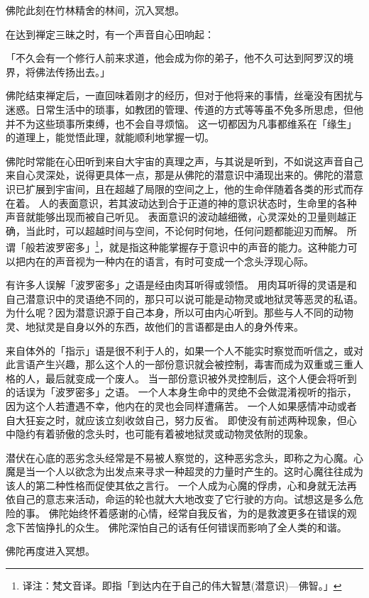 \documentclass[twoside,openany]{book}
\begin{document}
佛陀此刻在竹林精舍的林间，沉入冥想。

在达到禅定三昧之时，有一个声音自心田响起：

「不久会有一个修行人前来求道，他会成为你的弟子，他不久可达到阿罗汉的境界，将佛法传扬出去。」

佛陀结束禅定后，一直回味着刚才的经历，但对于他将来的事情，丝毫没有困扰与迷惑。日常生活中的琐事，如教团的管理、传道的方式等等虽不免多所思虑，但他并不为这些琐事所束缚，也不会自寻烦恼。
这一切都因为凡事都维系在「缘生」的道理上，能觉悟此理，就能顺利地掌握一切。

佛陀时常能在心田听到来自大宇宙的真理之声，与其说是听到，不如说这声音自己来自心灵深处，说得更具体一点，那是从佛陀的潜意识中涌现出来的。佛陀的潜意识已扩展到宇宙间，且在超越了局限的空间之上，他的生命伴随着各类的形式而存在着。
人的表面意识，若其波动达到合于正道的神的意识状态时，生命里的各种声音就能够出现而被自己听见。
表面意识的波动越细微，心灵深处的卫量则越正确，当此时，可以超越时间与空间，不论何时何地，任何问题都能迎刃而解。
所谓「般若波罗密多」\footnote{译注：梵文音译。即指「到达内在于自己的伟大智慧(潜意识)—佛智。」}，就是指这种能掌握存于意识中的声音的能力。这种能力可以把内在的声音视为一种内在的语言，有时可变成一个念头浮现心际。

有许多人误解「波罗密多」之语是经由肉耳听得或领悟。
用肉耳听得的灵语是和自己潜意识中的灵语绝不同的，那只可以说可能是动物灵或地狱灵等恶灵的私语。为什么呢？因为潜意识源于自己本身，所以可由内心听到。那些与人不同的动物灵、地狱灵是自身以外的东西，故他们的言语都是由人的身外传来。

来自体外的「指示」语是很不利于人的，如果一个人不能实时察觉而听信之，或对此言语产生兴趣，那么这个人的一部份意识就会被控制，毒害而成为双重或三重人格的人，最后就变成一个废人。
当一部份意识被外灵控制后，这个人便会将听到的话误为「波罗密多」之语。
一个人本身生命中的灵绝不会做混淆视听的指示，因为这个人若遭遇不幸，他内在的灵也会同样遭痛苦。
一个人如果感情冲动或者自大狂妄之时，就应该立刻收敛自己，努力反省。
即使没有前述两种现象，但心中隐约有着骄傲的念头时，也可能有着被地狱灵或动物灵依附的现象。

潜伏在心底的恶劣念头经常是不易被人察觉的，这种恶劣念头，即称之为心魔。心魔是当一个人以欲念为出发点来寻求一种超灵的力量时产生的。这时心魔往往成为该人的第二种性格而促使其依之言行。
一个人成为心魔的俘虏，心和身就无法再依自己的意志来活动，命运的轮也就大大地改变了它行驶的方向。试想这是多么危险的事。
佛陀始终怀着感谢的心情，经常自我反省，为的是救渡更多在错误的观念下苦恼挣扎的众生。
佛陀深怕自己的话有任何错误而影响了全人类的和谐。

佛陀再度进入冥想。
\end{document}
